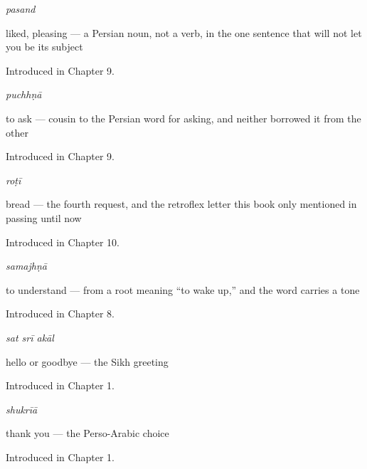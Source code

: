 \noindent\begin{minipage}[t]{\linewidth}
\raggedright
\textbf{}\enspace\emph{pasand}\par
\small liked, pleasing — a Persian noun, not a verb, in the one sentence that will not let you be its subject\par
\footnotesize Introduced in Chapter 9.
\end{minipage}\par\medskip

\noindent\begin{minipage}[t]{\linewidth}
\raggedright
\textbf{}\enspace\emph{puchhṇā}\par
\small to ask — cousin to the Persian word for asking, and neither borrowed it from the other\par
\footnotesize Introduced in Chapter 9.
\end{minipage}\par\medskip

\noindent\begin{minipage}[t]{\linewidth}
\raggedright
\textbf{}\enspace\emph{roṭī}\par
\small bread — the fourth request, and the retroflex letter this book only mentioned in passing until now\par
\footnotesize Introduced in Chapter 10.
\end{minipage}\par\medskip

\noindent\begin{minipage}[t]{\linewidth}
\raggedright
\textbf{}\enspace\emph{samajhṇā}\par
\small to understand — from a root meaning “to wake up,” and the word carries a tone\par
\footnotesize Introduced in Chapter 8.
\end{minipage}\par\medskip

\noindent\begin{minipage}[t]{\linewidth}
\raggedright
\textbf{  }\enspace\emph{sat srī akāl}\par
\small hello or goodbye — the Sikh greeting\par
\footnotesize Introduced in Chapter 1.
\end{minipage}\par\medskip

\noindent\begin{minipage}[t]{\linewidth}
\raggedright
\textbf{}\enspace\emph{shukrīā}\par
\small thank you — the Perso-Arabic choice\par
\footnotesize Introduced in Chapter 1.
\end{minipage}\par\medskip

